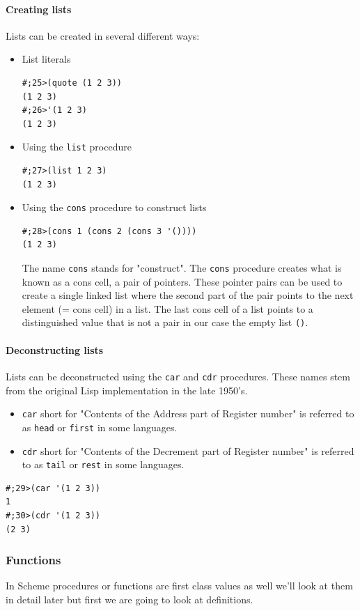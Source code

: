 \documentclass[12pt,a4paper,english,twoside]{article}
\begin{document}
\paragraph{Creating lists}
Lists can be created in several different ways:
\begin{itemize}
\item List literals \begin{lstlisting}
#;25>(quote (1 2 3))
(1 2 3)
#;26>'(1 2 3)
(1 2 3)
\end{lstlisting}
\item Using the \texttt{list} procedure
\begin{lstlisting}
#;27>(list 1 2 3)
(1 2 3)
\end{lstlisting}
\item Using the \texttt{cons} procedure to construct lists  \begin{lstlisting}
#;28>(cons 1 (cons 2 (cons 3 '())))
(1 2 3)
\end{lstlisting}
The name \texttt{cons} stands for "construct". The \texttt{cons} procedure 
creates what is known as a cons cell, a pair of pointers. These pointer pairs 
can be used to create a single linked list where the second part of the pair 
points to the next element (= cons cell) in a list. The last cons cell of a 
list points to a distinguished value that is not a pair in our case the empty 
list \texttt{()}.  \end{itemize}
\paragraph{Deconstructing lists}
Lists can be deconstructed using the \texttt{car} and \texttt{cdr} procedures. 
These names stem from the original Lisp implementation in the late 1950's.  
\begin{itemize}
\item \texttt{car} short for "Contents of the Address part of Register number" 
  is referred to as \texttt{head} or \texttt{first} in some languages.
\item \texttt{cdr} short for "Contents of the Decrement part of Register 
  number" is referred to as \texttt{tail} or \texttt{rest} in some languages.
\end{itemize} \begin{lstlisting}
#;29>(car '(1 2 3))
1
#;30>(cdr '(1 2 3))
(2 3)
\end{lstlisting}
\subsubsection{Functions}
In Scheme procedures or functions are first class values as well we'll look at 
them in detail later but first we are going to look at definitions.
\end{document}
